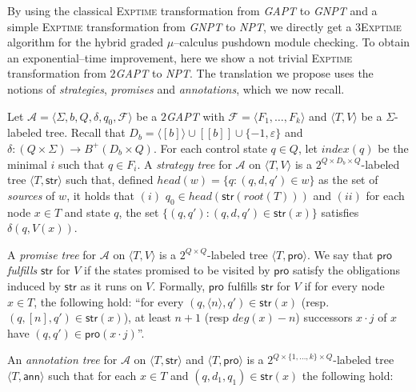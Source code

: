 \documentclass{LMCS}
\theoremstyle{plain}
\def \A             {\mathcal{A}}
\def \ann           {\ensuremath{\mathsf{ann}}\xspace}
\def \EXPTIME       {\textsc{Exptime}\xspace}
\def \F             {\mathcal{F}}
\def \GAPT          {\emph{GAPT}\xspace}
\def \GNPT          {\emph{GNPT}\xspace}
\def \head          {head}
\def \NPT           {\emph{NPT}\xspace}
\def \prom          {\ensuremath{\mathsf{pro}}\xspace}
\def \strat         {\ensuremath{\mathsf{str}}\xspace}
\def \TGAPT         {\emph{$2$GAPT}\xspace}
\def \THREEEXPTIME  {\textsc{3Exptime}\xspace}
\newcommand \tpl[1] {\langle #1 \rangle}
\begin{document}
By using the classical \EXPTIME transformation from \GAPT to \GNPT
\cite{KSV02} and a simple \EXPTIME transformation from \GNPT to
\NPT, we directly get a \THREEEXPTIME algorithm for the hybrid
graded $\mu$--calculus pushdown module checking. To obtain an
exponential--time improvement, here we show a not trivial \EXPTIME
transformation from \TGAPT to \NPT.
The translation we propose uses the notions of \emph{strategies},
\emph{promises} and \emph{annotations}, which we now recall.

Let $\A = \tpl{\Sigma, b, Q, \delta, q_0, \F}$ be a \TGAPT with
$\F = \tpl{F_1, \ldots, F_k}$ and $\tpl{T,V}$ be a
$\Sigma$-labeled tree. Recall that $D_b = \tpl{[b]} \cup [[b]]
\cup \{-1, \varepsilon\}$ and $\delta: (Q \times \Sigma)
\rightarrow B^{+}(D_b \times Q)$. For each control state $q \in
Q$, let $index(q)$ be the minimal $i$ such that $q \in F_i$. A
\emph{strategy tree} for $\A$ on $\tpl{T,V}$ is a $2^{Q \times D_b
\times Q}$-labeled tree $\tpl{T,\strat}$ such that, defined
$\head(w) = \{q : (q, d, q') \in w \}$ as the set of
\emph{sources} of $w$, it holds that $(i)$ $q_0 \in
\head(\strat(\mathit{root}(T)))$ and $(ii)$ for each node $x \in
T$ and state $q$, the set $\{(q, q') : (q,d,q') \in \strat(x)\}$
satisfies $\delta(q,V(x))$.

A \emph{promise tree} for $\A$ on $\tpl{T,V}$ is a $2^{Q \times
Q}$-labeled tree $\tpl{T,\prom}$. We say that $\prom$
\emph{fulfills} $\strat$ for $V$ if the states promised to be
visited by $\prom$ satisfy the obligations induced by $\strat$ as
it runs on $V$. Formally, $\prom$ fulfills $\strat$ for $V$ if for
every node $x \in T$, the following hold: ``for every $(q,
\tpl{n}, q') \in \strat(x)$ (resp. $(q, [n], q') \in \strat(x)$),
at least $n+1$ (resp $deg(x)-n$) successors $x \cdot j$ of $x$
have $(q,q') \in \prom(x \cdot j)$''.

An \emph{annotation tree} for $\A$ on $\tpl{T,\strat}$ and $\tpl{T, \prom}$ is
a $2^{Q \times \{1, \ldots, k\} \times Q}$-labeled tree $\tpl{T,\ann}$ such
that for each $x \in T$ and $(q, d_1, q_1) \in \strat(x)$ the following hold:
\end{document}
